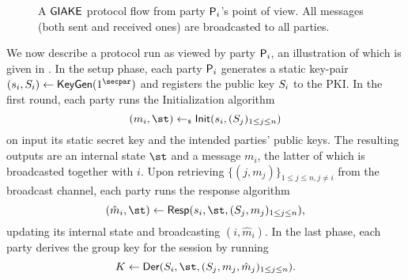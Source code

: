 \begin{figure}
	\centering 
	
	\caption{A $\GIAKE$ protocol flow from party $\User[i]$'s point of view. All messages (both sent and received ones) are broadcasted to all parties.}\label{fig:giakeprocedure}
\end{figure}

	We now describe a protocol run as viewed by party $\User[i]$, an illustration of which is given in .
	In the setup phase, each party $\User[i]$ generates a static key-pair $(\ssk_i,\spk_i) \gets \KeyGen(1^\secpar)$ and registers the public key $\spk_i$ to the PKI.
	In the first round, each party runs the Initialization algorithm \[(m_i,\st) \getsr \GAKEIni (\ssk_i,(\spk_j)_{1\leq j \leq n})\] on input its static secret key and the intended parties' public keys. 
	The resulting outputs are an internal state $\st$ and a message $m_i$, the latter of which is broadcasted together with $i$.
	Upon retrieving $\{(j,m_j)\}_{1\leq j \leq n, j \neq i}$ from the broadcast channel, each party runs the response algorithm \[(\hat{m}_i,\st) \gets \GAKERes(\ssk_i,\st,(\spk_j,m_j)_{1\leq j \leq n}),\] updating its internal state and broadcasting $(i,\hat{m}_i)$.
	In the last phase, each party derives the group key for the session by running \[K \gets \GAKEDer (\spk_i,\st,(\spk_j,m_j,\hat{m}_j)_{1\leq j \leq n}).\]
	
